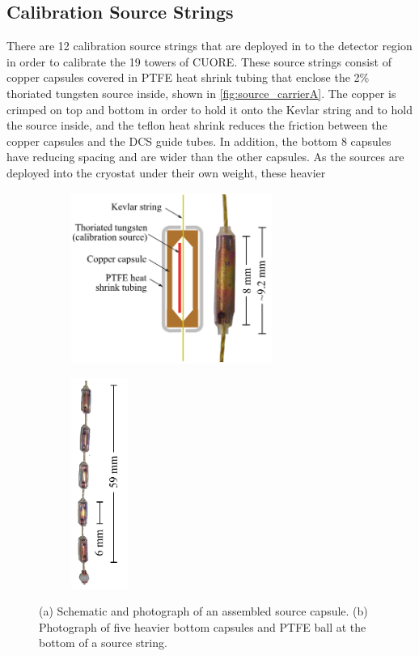 \subsection{Calibration Source Strings}
There are 12 calibration source strings that are deployed in to the detector region in order to calibrate the 19 towers of CUORE. These source strings consist of copper capsules covered in PTFE heat shrink tubing that enclose the 2\% thoriated tungsten source inside, shown in \autoref{fig:source_carrierA}. The copper is crimped on top and bottom in order to hold it onto the Kevlar string and to hold the source inside, and the teflon heat shrink reduces the friction between the copper capsules and the DCS guide tubes. In addition, the bottom 8 capsules have reducing spacing and are wider than the other capsules. As the sources are deployed into the cryostat under their own weight, these heavier 

\begin{figure}[htpb]
\begin{center}
\begin{subfigure}[b]{0.60\textwidth}
\includegraphics[height=2.2in]{Figures/source_capsule_schematic.pdf}
\caption{}
\label{fig:source_carrierA}
\end{subfigure}
\begin{subfigure}[b]{0.15\textwidth}
\includegraphics[height=2.7in]{Figures/string_bottom.pdf}
\caption{}
\label{fig:source_carrierB}
\end{subfigure}
\end{center}
\caption[(a) Schematic and photograph of an assembled source capsule. (b) Photograph of five heavier bottom capsules and PTFE ball at the bottom of a source string.]{(a) Schematic and photograph of an assembled source capsule. (b) Photograph of five heavier bottom capsules and PTFE ball at the bottom of a source string.}
\label{fig:source_carrier}
\end{figure}
 

